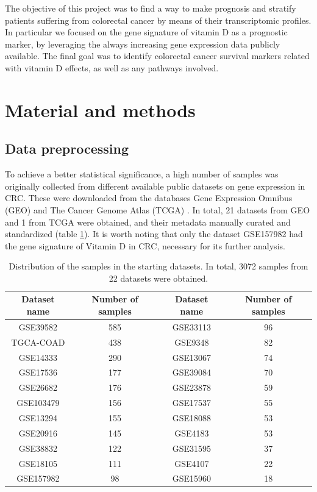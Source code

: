 \documentclass[fleqn,10pt]{SelfArx} %
\begin{document}
	The objective of this project was to find a way to make prognosis and stratify patients suffering from colorectal cancer by means of their transcriptomic profiles. In particular we focused on the gene signature of vitamin D as a prognostic marker, by leveraging the always increasing gene expression data publicly available. The final goal was to identify colorectal cancer survival markers related with vitamin D effects, as well as any pathways involved.


\section{Material and methods}
	\subsection{Data preprocessing}
		To achieve a better statistical significance, a high number of samples was originally collected from different available public datasets on gene expression in CRC. These were downloaded from the databases Gene Expression Omnibus (GEO) \cite{GEO} and The Cancer Genome Atlas (TCGA) \cite{TCGA}. In total, 21 datasets from GEO and 1 from TCGA were obtained, and their metadata manually curated and standardized (table \ref{tab:datasets}). It is worth noting that only the dataset GSE157982 had the gene signature of Vitamin D in CRC, necessary for its further analysis.

		\begin{table}[ht]
		    \centering
		    \begin{tabular}{cccc}
		        \hline
		        Dataset name & Number of samples & Dataset name & Number of samples\\
		        \hline
		        GSE39582 & 585 & GSE33113 & 96 \\
		        TGCA-COAD & 438 & GSE9348 & 82 \\
		        GSE14333 & 290 & GSE13067 & 74 \\
		        GSE17536 & 177 & GSE39084 & 70 \\
		        GSE26682 & 176 & GSE23878 & 59 \\
		        GSE103479 & 156 & GSE17537 & 55 \\
		        GSE13294 & 155 & GSE18088 & 53 \\
		        GSE20916 & 145 & GSE4183 & 53 \\
		        GSE38832 & 122 & GSE31595 & 37 \\
		        GSE18105 & 111 & GSE4107 & 22 \\
		        GSE157982 & 98 & GSE15960 & 18 \\
		        \hline
		    \end{tabular}
		    \caption{Distribution of the samples in the starting datasets. In total, 3072 samples from 22 datasets were obtained.}
		    \label{tab:datasets}
		\end{table}
\end{document}
